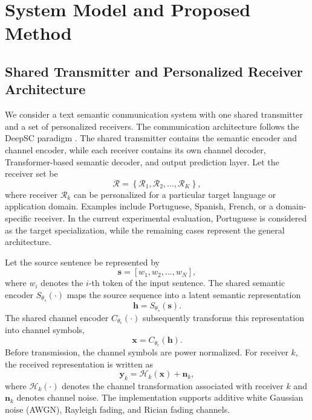 \documentclass[conference]{IEEEtran}
\begin{document}
\section{System Model and Proposed Method}

\subsection{Shared Transmitter and Personalized Receiver Architecture}

We consider a text semantic communication system with one shared transmitter and a set of personalized receivers. The communication architecture follows the DeepSC paradigm \cite{xie2021deepsc}. The shared transmitter contains the semantic encoder and channel encoder, while each receiver contains its own channel decoder, Transformer-based semantic decoder, and output prediction layer. Let the receiver set be
\begin{equation}
    \mathcal{R}
    =
    \left\{
        \mathcal{R}_1,
        \mathcal{R}_2,
        \ldots,
        \mathcal{R}_K
    \right\},
\end{equation}
where receiver $\mathcal{R}_k$ can be personalized for a particular target language or application domain. Examples include Portuguese, Spanish, French, or a domain-specific receiver. In the current experimental evaluation, Portuguese is considered as the target specialization, while the remaining cases represent the general architecture.

Let the source sentence be represented by
\begin{equation}
    \mathbf{s}=[w_1,w_2,\ldots,w_N],
\end{equation}
where $w_i$ denotes the $i$-th token of the input sentence. The shared semantic encoder $S_{\theta_s}(\cdot)$ maps the source sequence into a latent semantic representation
\begin{equation}
    \mathbf{h}=S_{\theta_s}(\mathbf{s}).
\end{equation}
The shared channel encoder $C_{\theta_c}(\cdot)$ subsequently transforms this representation into channel symbols,
\begin{equation}
    \mathbf{x}=C_{\theta_c}(\mathbf{h}).
\end{equation}
Before transmission, the channel symbols are power normalized. For receiver $k$, the received representation is written as
\begin{equation}
    \mathbf{y}_k
    =
    \mathcal{H}_k(\mathbf{x})
    +
    \mathbf{n}_k,
\end{equation}
where $\mathcal{H}_k(\cdot)$ denotes the channel transformation associated with receiver $k$ and $\mathbf{n}_k$ denotes channel noise. The implementation supports additive white Gaussian noise (AWGN), Rayleigh fading, and Rician fading channels.
\end{document}

